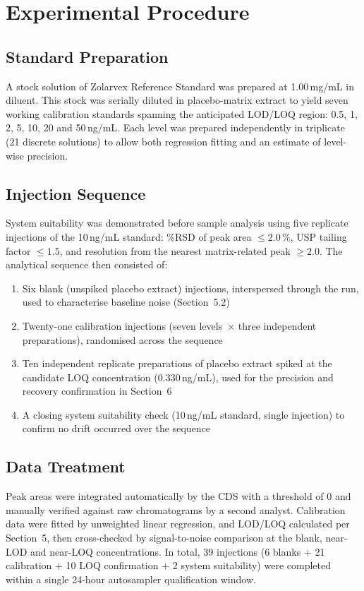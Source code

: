 
\section{Experimental Procedure}

\subsection{Standard Preparation}
A stock solution of Zolarvex Reference Standard was prepared at 1.00\,mg/mL in
diluent. This stock was serially diluted in placebo-matrix extract to yield seven
working calibration standards spanning the anticipated LOD/LOQ region:
0.5, 1, 2, 5, 10, 20 and 50\,ng/mL. Each level was prepared independently in
triplicate (21 discrete solutions) to allow both regression fitting and an estimate of
level-wise precision.

\subsection{Injection Sequence}
System suitability was demonstrated before sample analysis using five replicate
injections of the 10\,ng/mL standard: \%RSD of peak area $\leq 2.0\,\%$, USP tailing
factor $\leq 1.5$, and resolution from the nearest matrix-related peak $\geq 2.0$. The
analytical sequence then consisted of:
\begin{enumerate}[leftmargin=1.6em]
  \item Six blank (unspiked placebo extract) injections, interspersed through the
        run, used to characterise baseline noise (Section~5.2)
  \item Twenty-one calibration injections (seven levels~$\times$ three independent
        preparations), randomised across the sequence
  \item Ten independent replicate preparations of placebo extract spiked at the
        candidate LOQ concentration (0.330\,ng/mL), used for the precision and
        recovery confirmation in Section~6
  \item A closing system suitability check (10\,ng/mL standard, single injection)
        to confirm no drift occurred over the sequence
\end{enumerate}

\subsection{Data Treatment}
Peak areas were integrated automatically by the CDS with a threshold of 0 and manually
verified against raw chromatograms by a second analyst. Calibration data were fitted
by unweighted linear regression, and LOD/LOQ calculated per Section~5, then
cross-checked by signal-to-noise comparison at the blank, near-LOD and near-LOQ
concentrations. In total, 39 injections (6 blanks + 21 calibration + 10 LOQ
confirmation + 2 system suitability) were completed within a single 24-hour
autosampler qualification window.
